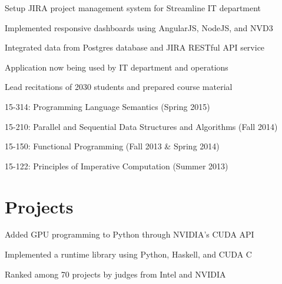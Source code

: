 \documentclass[letterpaper]{deedy-resume} %
\begin{document}
\begin{minipage}[t]{0.66\textwidth}
\begin{tightitemize}
\item Setup JIRA project management system for Streamline IT department
\item Implemented responsive dashboards using AngularJS, NodeJS, and NVD3
\item Integrated data from Postgres database and JIRA RESTful API service 
\item Application now being used by IT department and operations
\end{tightitemize}

\sectionspace %



\begin{tightitemize}
\item Lead recitations of 20\textendash{}30 students and prepared course material
\item 15-314: Programming Language Semantics (Spring 2015)
\item 15-210: Parallel and Sequential Data Structures and Algorithms (Fall 2014)
\item 15-150: Functional Programming (Fall 2013 \& Spring 2014)
\item 15-122: Principles of Imperative Computation (Summer 2013)
\end{tightitemize}

\sectionspace %


\section{Projects}


\begin{tightitemize}
\item Added GPU programming to Python through NVIDIA's CUDA API
\item Implemented a runtime library using Python, Haskell, and CUDA C
\item Ranked  among 70 projects by judges from Intel and NVIDIA
\end{tightitemize}


\end{minipage}
\end{document}

